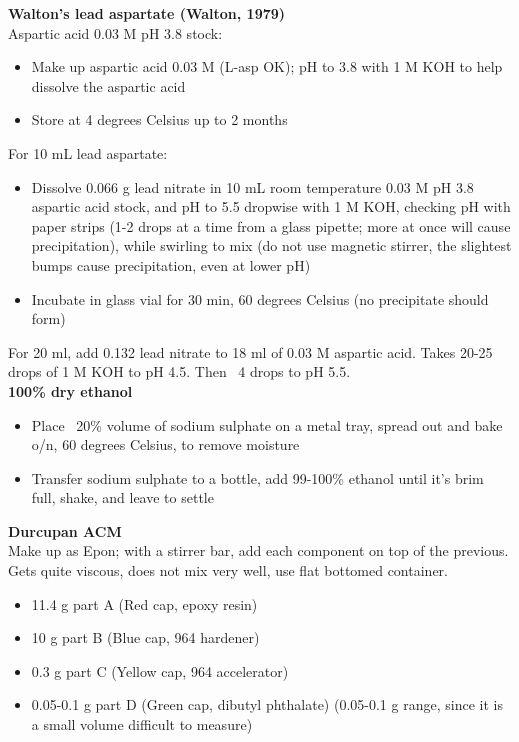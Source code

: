 \noindent
\textbf{Walton’s lead aspartate (Walton, 1979)} \\
Aspartic acid 0.03 M pH 3.8 stock:
\begin{itemize}
\item Make up aspartic acid 0.03 M (L-asp OK); pH to 3.8 with 1 M KOH to help dissolve the aspartic acid
\item Store at 4 degrees Celsius up to 2 months
\end{itemize}
For 10 mL lead aspartate:
\begin{itemize}
\item Dissolve 0.066 g lead nitrate in 10 mL room temperature 0.03 M pH 3.8 aspartic acid stock, and pH to 5.5 dropwise with 1 M KOH, checking pH with paper strips (1-2 drops at a time from a glass pipette; more at once will cause precipitation), while swirling to mix (do not use magnetic stirrer, the slightest bumps cause precipitation, even at lower pH)
\item Incubate in glass vial for 30 min, 60 degrees Celsius (no precipitate should form)
\end{itemize}
For 20 ml, add 0.132 lead nitrate to 18 ml of 0.03 M aspartic acid. Takes 20-25 drops of 1 M KOH to pH 4.5. Then ~4 drops to pH 5.5. \\

\noindent
\textbf{100\% dry ethanol} 
\begin{itemize}
\item Place ~20\% volume of sodium sulphate on a metal tray, spread out and bake o/n, 60 degrees Celsius, to remove moisture
\item Transfer sodium sulphate to a bottle, add 99-100\% ethanol until it’s brim full, shake, and leave to settle
\end{itemize}

\noindent
\textbf{Durcupan ACM} \\
Make up as Epon; with a stirrer bar, add each component on top of the previous. Gets quite viscous, does not mix very well, use flat bottomed container.
\begin{itemize}
\item 11.4 g part A (Red cap, epoxy resin)
\item 10 g part B (Blue cap, 964 hardener)
\item 0.3 g part C (Yellow cap, 964 accelerator)
\item 0.05-0.1 g part D (Green cap, dibutyl phthalate) (0.05-0.1 g range, since it is a small volume difficult to measure)
\end{itemize}


